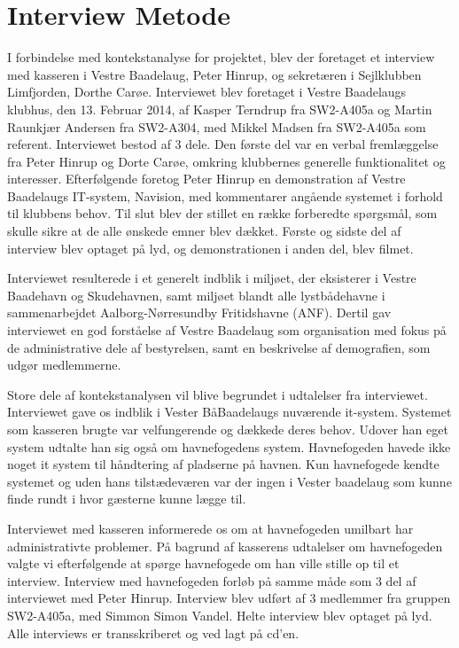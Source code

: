 \section{Interview Metode}

I forbindelse med kontekstanalyse for projektet, blev der foretaget et interview med kasseren i Vestre Baadelaug, Peter Hinrup, og sekretæren i Sejlklubben Limfjorden, Dorthe Carøe. Interviewet blev foretaget i Vestre Baadelaugs klubhus, den 13. Februar 2014, af Kasper Terndrup fra SW2-A405a og Martin Raunkjær Andersen fra SW2-A304, med Mikkel Madsen fra SW2-A405a som referent. Interviewet bestod af 3 dele. Den første del var en verbal fremlæggelse fra Peter Hinrup og Dorte Carøe, omkring klubbernes generelle funktionalitet og interesser. Efterfølgende foretog Peter Hinrup en demonstration af Vestre Baadelaugs IT-system, Navision, med kommentarer angående systemet i forhold til klubbens behov. Til slut blev der stillet en række forberedte spørgsmål, som skulle sikre at de alle ønskede emner blev dækket. Første og sidste del af interview blev optaget på lyd, og demonstrationen i anden del, blev filmet.

Interviewet resulterede i et generelt indblik i miljøet, der eksisterer i Vestre Baadehavn og Skudehavnen, samt miljøet blandt alle lystbådehavne i sammenarbejdet Aalborg-Nørresundby Fritidshavne (ANF). Dertil gav interviewet en god forståelse af Vestre Baadelaug som organisation med fokus på de administrative dele af bestyrelsen, samt en beskrivelse af demografien, som udgør medlemmerne.

Store dele af kontekstanalysen vil blive begrundet i udtalelser fra interviewet. Interviewet gave os indblik i Vester BåBaadelaugs nuværende it-system. Systemet som kasseren brugte var velfungerende og dækkede deres behov. Udover han eget system udtalte han sig også om havnefogedens system. Havnefogeden havede ikke noget it system til håndtering af pladserne på havnen. Kun havnefogede kendte systemet og uden hans tilstædeværen var der ingen i Vester baadelaug som kunne finde rundt i hvor gæsterne kunne lægge til. 

Interviewet med kasseren informerede os om at havnefogeden umilbart har administrativte problemer. På bagrund af kasserens udtalelser om havnefogeden valgte vi efterfølgende at spørge havnefogede om han ville stille op til et interview.
Interview med havnefogeden forløb på samme måde som 3 del af interviewet med Peter Hinrup. Interview blev udført af 3 medlemmer fra gruppen SW2-A405a, med Simmon Simon Vandel. Helte interview blev optaget på lyd. Alle interviews er transskriberet og ved lagt på cd'en. 

